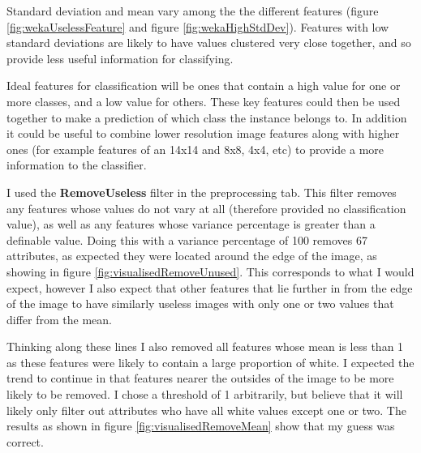 \documentclass[10pt]{article}
\begin{document}
      Standard deviation and mean vary among the the different features (figure \ref{fig:wekaUselessFeature} and figure \ref{fig:wekaHighStdDev}). Features with low standard deviations are likely to have values clustered very close together, and so provide less useful information for classifying.

      Ideal features for classification will be ones that contain a high value for one or more classes, and a low value for others. These key features could then be used together to make a prediction of which class the instance belongs to. In addition it could be useful to combine lower resolution image features along with higher ones (for example features of an 14x14 and 8x8, 4x4, etc) to provide a more information to the classifier.

      I used the \textbf{RemoveUseless} filter in the preprocessing tab. This filter removes any features whose values do not vary at all (therefore provided no classification value), as well as any features whose variance percentage is greater than a definable value. Doing this with a variance percentage of 100 removes 67 attributes, as expected they were located around the edge of the image, as showing in figure \ref{fig:visualisedRemoveUnused}. This corresponds to what I would expect, however I also expect that other features that lie further in from the edge of the image to have similarly useless images with only one or two values that differ from the mean.

      Thinking along these lines I also removed all features whose mean is less than 1 as these features were likely to contain a large proportion of white. I expected the trend to continue in that features nearer the outsides of the image to be more likely to be removed. I chose a threshold of 1 arbitrarily, but believe that it will likely only filter out attributes who have all white values except one or two. The results as shown in figure \ref{fig:visualisedRemoveMean} show that my guess was correct.
\end{document}
